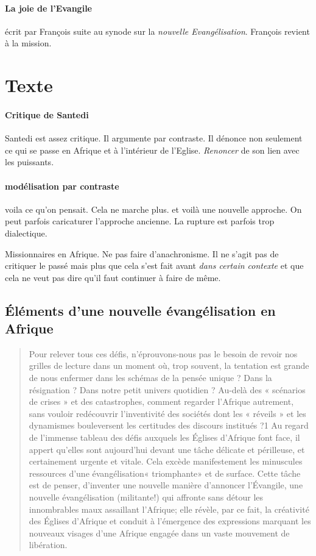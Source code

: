 \paragraph{La joie de l'Evangile} écrit par François suite au synode sur la \textit{nouvelle Evangélisation}. François revient à la mission. 
\section{Texte}

\paragraph{Critique de Santedi}
Santedi est assez critique. Il argumente par contraste. Il dénonce non seulement ce qui se passe en Afrique et à l'intérieur de l'Eglise. \textit{Renoncer} de son lien avec les puissants. 

\paragraph{modélisation par contraste} voila ce qu'on pensait. Cela ne marche plus. et voilà une nouvelle approche. On peut parfois caricaturer l'approche ancienne. La rupture est parfois trop dialectique. 
\begin{Ex}
    Missionnaires en Afrique. Ne pas faire d'anachronisme. Il ne s'agit pas de critiquer le passé mais plus que cela s'est fait avant \textit{dans certain contexte} et que cela ne veut pas dire qu'il faut continuer à faire de même. 
    
\end{Ex}


\subsection{Éléments d'une nouvelle
évangélisation en Afrique}

\begin{quote}
    Pour relever tous ces défis, n'éprouvons-nous pas le besoin
de revoir nos grilles de lecture dans un moment où, trop souvent,
la tentation est grande de nous enfermer dans les schémas
de la pensée unique ? Dans la résignation ? Dans notre petit univers
quotidien ? Au-delà des « scénarios de crises » et des catastrophes,
comment regarder l'Afrique autrement, sans vouloir
redécouvrir l'inventivité des sociétés dont les « réveils » et les
dynamismes bouleversent les certitudes des discours institués ?1
Au regard de l'immense tableau des défis auxquels les
Églises d'Afrique font face, il appert qu'elles sont aujourd'hui
devant une tâche délicate et périlleuse, et certainement urgente
et vitale. Cela excède manifestement les minuscules ressources
d'une évangélisation« triomphante» et de surface. Cette tâche
est de penser, d'inventer une nouvelle manière d'annoncer
l'Évangile, une nouvelle évangélisation (militante!) qui affronte
sans détour les innombrables maux assaillant l'Afrique; elle
révèle, par ce fait, la créativité des Églises d'Afrique et conduit à
l'émergence des expressions marquant les nouveaux visages
d'une Afrique engagée dans un vaste mouvement de libération.
\end{quote}


